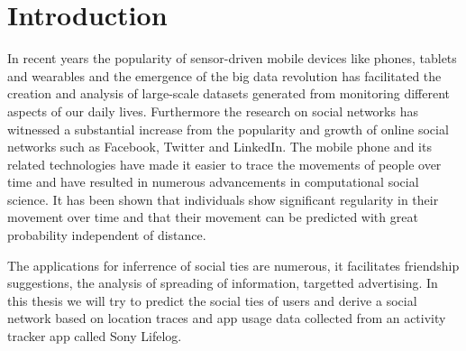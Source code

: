 \section{Introduction}
In recent years the popularity of sensor-driven mobile devices like phones, tablets and wearables and the emergence of the big data revolution has facilitated the creation and analysis of large-scale datasets generated from monitoring different aspects of our daily lives\cite{lazer2009life}. Furthermore the research on social networks has witnessed a substantial increase from the popularity and growth of online social networks such as Facebook, Twitter and LinkedIn\cite{social_networks}. The mobile phone and its related technologies have made it easier to trace the movements of people over time and have resulted in numerous advancements in computational social science. It has been shown that individuals show significant regularity in their movement over time\cite{Uihmp} and that their movement can be predicted with great probability independent of distance\cite{LoPiHM}.


The applications for inferrence of social ties are numerous, it facilitates friendship suggestions, the analysis of spreading of information, targetted advertising.
In this thesis we will try to predict the social ties of users and derive a social network based on location traces and app usage data collected from an activity tracker app called Sony Lifelog\cite{sonyLifeLog}.
    

